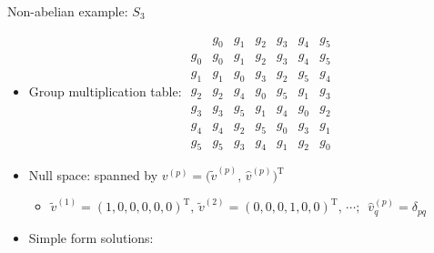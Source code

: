 \documentclass{fdubeamer}
\newcommand{\1}{\mathbb{1}}
\newcommand{\trans}{{\mathrm{T}}}
\begin{document}
\begin{frame}{Non-abelian example: \texorpdfstring{$S_3$}{𝑆₃}}

\begin{itemize}
  \item Group multiplication table:
    \begingroup
      \tiny
      \setlength{\arraycolsep}{4pt}
      $
        \begin{array}{c|cccccc}
          & g_0 & g_1 & g_2 & g_3 & g_4 & g_5 \\
          \hline
          g_0 & g_0 & g_1 & g_2 & g_3 & g_4 & g_5 \\
          g_1 & g_1 & g_0 & g_3 & g_2 & g_5 & g_4 \\
          g_2 & g_2 & g_4 & g_0 & g_5 & g_1 & g_3 \\
          g_3 & g_3 & g_5 & g_1 & g_4 & g_0 & g_2 \\
          g_4 & g_4 & g_2 & g_5 & g_0 & g_3 & g_1 \\
          g_5 & g_5 & g_3 & g_4 & g_1 & g_2 & g_0
        \end{array}
      $
    \endgroup
  \item Null space: spanned by $v^{(p)}=\bigl( \tilde{v}^{(p)}, \, \hat{v}^{(p)} \bigr)^\trans$

    \begin{itemize}
      \item $\tilde{v}^{(1)}=(1,0,0,0,0,0)^\trans, \, \tilde{v}^{(2)}=(0,0,0,1,0,0)^\trans, \, \cdots; \enspace \hat{v}^{(p)}_q=\delta_{pq}$
    \end{itemize}

  \item Simple form solutions:


\end{itemize}
\end{frame}
\end{document}

